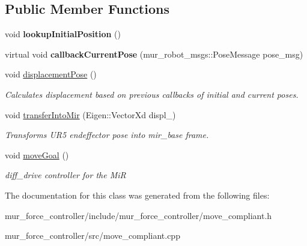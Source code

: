 \subsection*{Public Member Functions}
\begin{DoxyCompactItemize}
\item 
\mbox{\label{classmove__compliant_1_1MoveMir_a32309612bce2fdb3821b9fd006f55b38}} 
void {\bfseries lookup\+Initial\+Position} ()
\item 
\mbox{\label{classmove__compliant_1_1MoveMir_a793e53f3d1b2bc806a6bc2bac9185485}} 
virtual void {\bfseries callback\+Current\+Pose} (mur\+\_\+robot\+\_\+msgs\+::\+Pose\+Message pose\+\_\+msg)
\item 
\mbox{\label{classmove__compliant_1_1MoveMir_aed52a78493d1d15125bfdcf24912d20d}} 
void \hyperlink{classmove__compliant_1_1MoveMir_aed52a78493d1d15125bfdcf24912d20d}{displacement\+Pose} ()
\begin{DoxyCompactList}\small\item\em Calculates displacement based on previous callbacks of initial and current poses. \end{DoxyCompactList}\item 
\mbox{\label{classmove__compliant_1_1MoveMir_ae8932babb8005356b3bbb96da5f6631e}} 
void \hyperlink{classmove__compliant_1_1MoveMir_ae8932babb8005356b3bbb96da5f6631e}{transfer\+Into\+Mir} (Eigen\+::\+Vector\+Xd displ\+\_\+)
\begin{DoxyCompactList}\small\item\em Transforms U\+R5 endeffector pose into mir\+\_\+base frame. \end{DoxyCompactList}\item 
\mbox{\label{classmove__compliant_1_1MoveMir_ace126d2ec09b2015d4ad97cb28d3252a}} 
void \hyperlink{classmove__compliant_1_1MoveMir_ace126d2ec09b2015d4ad97cb28d3252a}{move\+Goal} ()
\begin{DoxyCompactList}\small\item\em diff\+\_\+drive controller for the MiR \end{DoxyCompactList}\end{DoxyCompactItemize}


The documentation for this class was generated from the following files\+:\begin{DoxyCompactItemize}
\item 
mur\+\_\+force\+\_\+controller/include/mur\+\_\+force\+\_\+controller/move\+\_\+compliant.\+h\item 
mur\+\_\+force\+\_\+controller/src/move\+\_\+compliant.\+cpp\end{DoxyCompactItemize}
